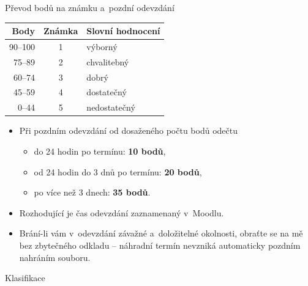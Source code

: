 \documentclass[11pt,professionalfont,aspectratio=43]{beamer}
\begin{document}
    \begin{frame}{Převod bodů na známku a~pozdní odevzdání}
        \begin{center}
            \begin{tabular}{r|c|l}
                \textbf{Body} & \textbf{Známka} & \textbf{Slovní hodnocení} \\ \hline
                90--100 & 1 & výborný \\
                75--89 & 2 & chvalitebný \\
                60--74 & 3 & dobrý \\
                45--59 & 4 & dostatečný \\
                0--44 & 5 & nedostatečný \\
            \end{tabular}
        \end{center}

        \begin{itemize}
            \item Při pozdním odevzdání od dosaženého počtu bodů odečtu
            \begin{itemize}
                \item do 24 hodin po termínu: \textbf{10 bodů},
                \item od 24 hodin do 3 dnů po termínu: \textbf{20 bodů},
                \item po více než 3 dnech: \textbf{35 bodů}.
            \end{itemize}
            \item Rozhodující je čas odevzdání zaznamenaný v~Moodlu.
            \item Brání-li vám v~odevzdání závažné a~doložitelné okolnosti, obraťte se na mě bez zbytečného odkladu -- náhradní termín nevzniká automaticky pozdním nahráním souboru.
        \end{itemize}
    \end{frame}

    \begin{frame}{Klasifikace}
        \begin{itemize}
        \end{itemize}
    \end{frame}
\end{document}
